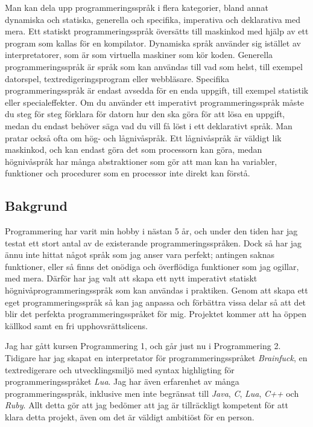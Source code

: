 \documentclass{theme}
\begin{document}
Man kan dela upp programmeringsspråk i flera kategorier, bland annat dynamiska
och statiska, generella och specifika, imperativa och deklarativa med mera. Ett
statiskt programmeringsspråk översätts till maskinkod med hjälp av ett program
som kallas för en kompilator. Dynamiska språk använder sig istället av
interpretatorer, som är som virtuella maskiner som kör koden. Generella
programmeringsspråk är språk som kan användas till vad som helst, till exempel
datorspel, textredigeringsprogram eller webbläsare. Specifika
programmeringsspråk är endast avsedda för en enda uppgift, till exempel
statistik eller specialeffekter. Om du använder ett imperativt
programmeringsspråk måste du steg för steg förklara för datorn hur den ska göra
för att lösa en uppgift, medan du endast behöver säga vad du vill få löst i ett
deklarativt språk. Man pratar också ofta om hög- och lågnivåspråk. Ett
lågnivåspråk är väldigt lik maskinkod, och kan endast göra det som processorn
kan göra, medan högnivåspråk har många abstraktioner som gör att man kan ha
variabler, funktioner och procedurer som en processor inte direkt kan förstå.

\subsection{Bakgrund}

Programmering har varit min hobby i nästan 5 år, och under den tiden har jag
testat ett stort antal av de existerande programmeringsspråken. Dock så har jag
ännu inte hittat något språk som jag anser vara perfekt; antingen saknas
funktioner, eller så finns det onödiga och överflödiga funktioner som jag
ogillar, med mera. Därför har jag valt att skapa ett nytt imperativt statiskt
högnivåprogrammeringsspråk som kan användas i praktiken. Genom att skapa ett
eget programmeringsspråk så kan jag anpassa och förbättra vissa delar så att det
blir det perfekta programmeringsspråket för mig.  Projektet kommer att ha öppen
källkod samt en fri upphovsrättslicens.

Jag har gått kursen Programmering 1, och går just nu i Programmering 2.
Tidigare har jag skapat en interpretator för programmeringsspråket
\textit{Brainfuck}, en textredigerare och utvecklingsmiljö med syntax
highligting för programmeringsspråket \textit{Lua}. Jag har även
erfarenhet av många programmeringsspråk, inklusive men inte begränsat till
\textit{Java}, \textit{C}, \textit{Lua}, \textit{C++} och \textit{Ruby}. Allt
detta gör att jag bedömer att jag är tillräckligt kompetent för att klara detta
projekt, även om det är väldigt ambitiöst för en person.
\end{document}
